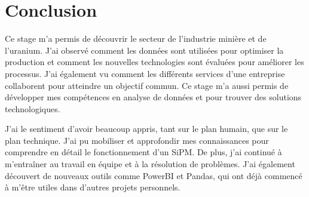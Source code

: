 \section{Conclusion}

Ce stage m'a permis de découvrir le secteur de l'industrie minière et de l'uranium. J'ai observé comment les données sont utilisées pour optimiser la production et comment les nouvelles technologies sont évaluées pour améliorer les processus. J'ai également vu comment les différents services d'une entreprise collaborent pour atteindre un objectif commun. Ce stage m'a aussi permis de développer mes compétences en analyse de données et pour trouver des solutions technologiques.

J'ai le sentiment d'avoir beaucoup appris, tant sur le plan humain, que sur le plan technique. J'ai pu mobiliser et approfondir mes connaissances pour comprendre en détail le fonctionnement d'un SiPM. De plus, j'ai continué à m'entraîner au travail en équipe et à la résolution de problèmes. J'ai également découvert de nouveaux outils comme PowerBI et Pandas, qui ont déjà commencé à m'être utiles dans d'autres projets personnels.